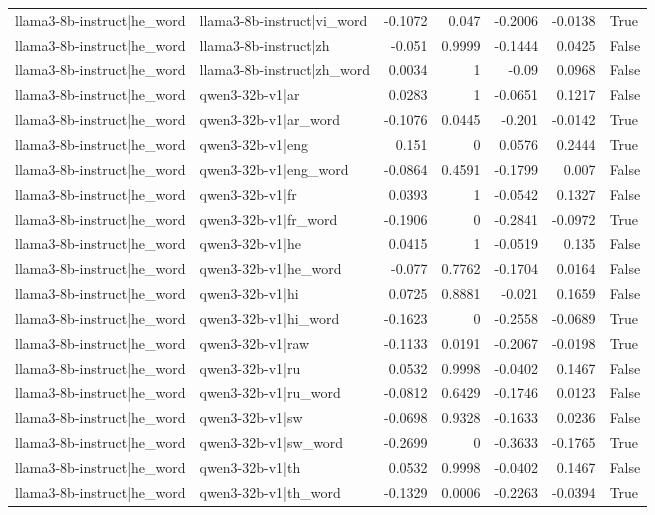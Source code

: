 \begin{table}
\begin{tabular}{l l r r r r l}
llama3-8b-instruct|he_word & llama3-8b-instruct|vi_word & -0.1072 & 0.047 & -0.2006 & -0.0138 & True \\
llama3-8b-instruct|he_word & llama3-8b-instruct|zh & -0.051 & 0.9999 & -0.1444 & 0.0425 & False \\
llama3-8b-instruct|he_word & llama3-8b-instruct|zh_word & 0.0034 & 1 & -0.09 & 0.0968 & False \\
llama3-8b-instruct|he_word & qwen3-32b-v1|ar & 0.0283 & 1 & -0.0651 & 0.1217 & False \\
llama3-8b-instruct|he_word & qwen3-32b-v1|ar_word & -0.1076 & 0.0445 & -0.201 & -0.0142 & True \\
llama3-8b-instruct|he_word & qwen3-32b-v1|eng & 0.151 & 0 & 0.0576 & 0.2444 & True \\
llama3-8b-instruct|he_word & qwen3-32b-v1|eng_word & -0.0864 & 0.4591 & -0.1799 & 0.007 & False \\
llama3-8b-instruct|he_word & qwen3-32b-v1|fr & 0.0393 & 1 & -0.0542 & 0.1327 & False \\
llama3-8b-instruct|he_word & qwen3-32b-v1|fr_word & -0.1906 & 0 & -0.2841 & -0.0972 & True \\
llama3-8b-instruct|he_word & qwen3-32b-v1|he & 0.0415 & 1 & -0.0519 & 0.135 & False \\
llama3-8b-instruct|he_word & qwen3-32b-v1|he_word & -0.077 & 0.7762 & -0.1704 & 0.0164 & False \\
llama3-8b-instruct|he_word & qwen3-32b-v1|hi & 0.0725 & 0.8881 & -0.021 & 0.1659 & False \\
llama3-8b-instruct|he_word & qwen3-32b-v1|hi_word & -0.1623 & 0 & -0.2558 & -0.0689 & True \\
llama3-8b-instruct|he_word & qwen3-32b-v1|raw & -0.1133 & 0.0191 & -0.2067 & -0.0198 & True \\
llama3-8b-instruct|he_word & qwen3-32b-v1|ru & 0.0532 & 0.9998 & -0.0402 & 0.1467 & False \\
llama3-8b-instruct|he_word & qwen3-32b-v1|ru_word & -0.0812 & 0.6429 & -0.1746 & 0.0123 & False \\
llama3-8b-instruct|he_word & qwen3-32b-v1|sw & -0.0698 & 0.9328 & -0.1633 & 0.0236 & False \\
llama3-8b-instruct|he_word & qwen3-32b-v1|sw_word & -0.2699 & 0 & -0.3633 & -0.1765 & True \\
llama3-8b-instruct|he_word & qwen3-32b-v1|th & 0.0532 & 0.9998 & -0.0402 & 0.1467 & False \\
llama3-8b-instruct|he_word & qwen3-32b-v1|th_word & -0.1329 & 0.0006 & -0.2263 & -0.0394 & True \\

\end{tabular}
\end{table}
